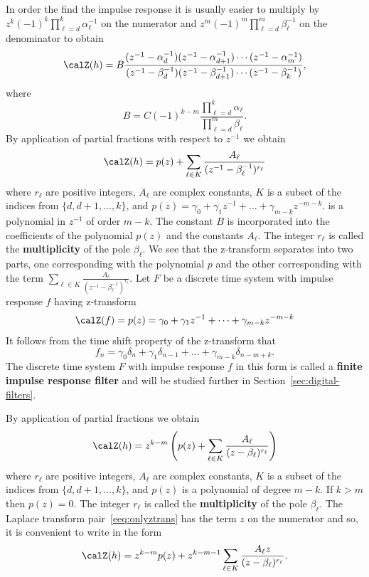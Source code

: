 \documentclass[11pt,a4paper]{book}
\theoremstyle{plain}
\numberwithin{equation}{section}
\newcommand{\term}{\textbf}
\begin{document}
In order the find the impulse response it is usually easier to multiply by $z^k(-1)^k\prod_{\ell=d}^k\alpha_\ell^{-1}$ on the numerator and $z^m(-1)^m\prod_{\ell=d}^m\beta_\ell^{-1}$ on the denominator to obtain
\[
\calZ(h) = B \frac{(z^{-1} - \alpha^{-1}_d)(z^{-1} - \alpha_{d+1}^{-1})\cdots(z^{-1} - \alpha_{m}^{-1})}{(z^{-1}-\beta_d^{-1})(z^{-1} - \beta_{d+1}^{-1})\cdots(z^{-1} - \beta_{k}^{-1})},
\]
where 
\[
B = C (-1)^{k-m} \frac{\prod_{\ell=d}^k\alpha_\ell}{\prod_{\ell=d}^m\beta_\ell}.
\]
By application of partial fractions with respect to $z^{-1}$ we obtain
\[
\calZ(h) = p(z) + \sum_{\ell \in K} \frac{A_\ell }{(z^{-1} - \beta_\ell^{-1})^{r_\ell}} 
\]
where $r_\ell$ are positive integers, $A_\ell$ are complex constants, $K$ is a subset of the indices from $\{d,d+1,\dots,k\}$, and $p(z) = \gamma_0 + \gamma_1 z^{-1} + \dots + \gamma_{m-k} z^{-m-k}$.  
is a polynomial in $z^{-1}$ of order $m-k$.  The constant $B$ is incorporated into the coefficients of the polynomial $p(z)$ and the constants $A_\ell$.   The integer $r_\ell$ is called the \term{multiplicity} of the pole $\beta_\ell$.  We see that the z-transform separates into two parts, one corresponding with the polynomial $p$ and the other corresponding with the term $\sum_{\ell \in K} \frac{A_\ell }{(z^{-1} - \beta_\ell^{-1})^{r_\ell}}$.  Let $F$ be a discrete time system with impulse response $f$ having z-transform 
\[
\calZ(f) = p(z) = \gamma_0 + \gamma_1 z^{-1} + \dots + \gamma_{m-k} z^{-m-k}
\]
It follows from the time shift property of the z-transform that 
\[
f_n = \gamma_0 \delta_n + \gamma_1 \delta_{n-1} + \dots + \gamma_{m-k} \delta_{n-m+k}.
\]
The discrete time system $F$ with impulse response $f$ in this form is called a \term{finite impulse response filter} and will be studied further in Section~\ref{sec:digital-filters}.

By application of partial fractions we obtain
\[
\calZ(h) = z^{k-m} \left( p(z) + \sum_{\ell \in K} \frac{A_\ell}{(z - \beta_\ell)^{r_\ell}} \right)
\]
where $r_\ell$ are positive integers, $A_\ell$ are complex constants, $K$ is a subset of the indices from $\{d,d+1,\dots,k\}$, and $p(z)$ is a polynomial of degree $m-k$.  If $k > m$ then $p(z) = 0$.  The integer $r_\ell$ is called the \term{multiplicity} of the pole $\beta_\ell$.  The Laplace transform pair~\eqref{eeq:onlyztrans} has the term $z$ on the numerator and so, it is convenient to write in the form
\[
\calZ(h) = z^{k-m} p(z) + z^{k-m-1} \sum_{\ell \in K} \frac{A_\ell z }{(z - \beta_\ell)^{r_\ell}}  .
\]

\end{document}
